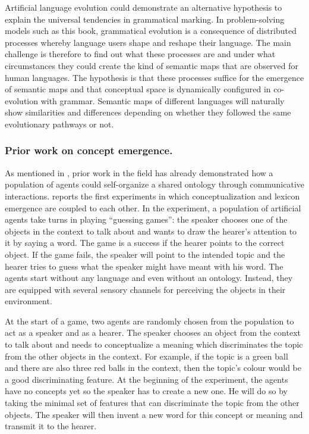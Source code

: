 Artificial language evolution could demonstrate an alternative hypothesis to explain the universal tendencies in grammatical marking. In problem-solving models such as this book, grammatical evolution is a consequence of distributed processes whereby language users shape and reshape their language. The main challenge is therefore to find out what these processes are and under what circumstances they could create the kind of semantic maps that are observed for human languages. The hypothesis is that these processes suffice for the emergence of semantic maps and that conceptual space is dynamically configured in co-evolution with grammar. Semantic maps of different languages will naturally show similarities and differences depending on whether they followed the same evolutionary pathways or not.


\subsubsection{Prior work on concept emergence.}

As mentioned in , prior work in the field has already demonstrated how a population of agents could self-organize a shared ontology through communicative interactions. \citet{steels97constructing} reports the first experiments in which conceptualization and lexicon emergence are coupled to each other. In the experiment, a population of artificial agents take turns in playing ``guessing games'': the speaker chooses one of the objects in the context to talk about and wants to draw the hearer's attention to it by saying a word. The game is a success if the hearer points to the correct object. If the game fails, the speaker will point to the intended topic and the hearer tries to guess what the speaker might have meant with his word. The agents start without any language and even without an ontology. Instead, they are equipped with several sensory channels for perceiving the objects in their environment.

At the start of a game, two agents are randomly chosen from the population to act as a speaker and as a hearer. The speaker chooses an object from the context to talk about and needs to conceptualize a meaning which discriminates the topic from the other objects in the context. For example, if the topic is a green ball and there are also three red balls in the context, then the topic's colour would be a good discriminating feature. At the beginning of the experiment, the agents have no concepts yet so the speaker has to create a new one. He will do so by taking the minimal set of features that can discriminate the topic from the other objects. The speaker will then invent a new word for this concept or meaning and transmit it to the hearer.


